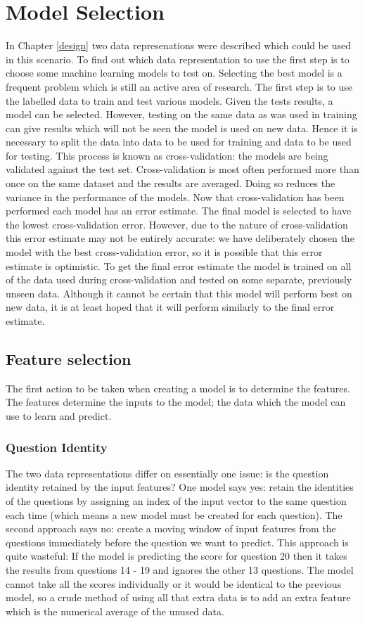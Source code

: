 \chapter{Model Selection}
\label{machinelearning}
In Chapter \ref{design} two data represenations were described which could be used in this scenario. To find out which data representation to use the first step is to choose some machine learning models to test on. Selecting the best model is a frequent problem which is still an active area of research. The first step is to use the labelled data to train and test various models. Given the tests results, a model can be selected. However, testing on the same data as was used in training can give results which will not be seen the model is used on new data. Hence it is necessary to split the data into data to be used for training and data to be used for testing. This process is known as cross-validation: the models are being validated against the test set. Cross-validation is most often performed more than once on the same dataset and the results are averaged. Doing so reduces the variance in the performance of the models.
Now that cross-validation has been performed each model has an error estimate. The final model is selected to have the lowest cross-validation error. However, due to the nature of cross-validation this error estimate may not be entirely accurate: we have deliberately chosen the model with the best cross-validation error, so it is possible that this error estimate is optimistic. To get the final error estimate the model is trained on all of the data used during cross-validation and tested on some separate, previously unseen data.
Although it cannot be certain that this model will perform best on new data, it is at least hoped that it will perform similarly to the final error estimate.

\section{Feature selection}
The first action to be taken when creating a model is to determine the features. The features determine the inputs to the model; the data which the model can use to learn and predict. 

\subsection{Question Identity}
The two data representations differ on essentially one issue: is the question identity retained by the input features? One model says yes: retain the identities of the questions by assigning an index of the input vector to the same question each time (which means a new model must be created for each question). The second approach says no: create a moving window of input features from the questions immediately before the question we want to predict. This approach is quite wasteful: If the model is predicting the score for question 20 then it takes the results from questions 14 - 19 and ignores the other 13 questions. The model cannot take all the scores individually or it would be identical to the previous model, so a crude method of using all that extra data is to add an extra feature which is the numerical average of the unused data.

